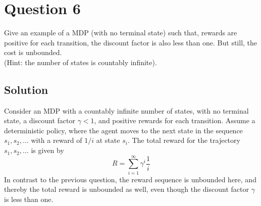 \section*{Question 6}

Give an example of a MDP (with no terminal state) such that, rewards are positive for each transition, the discount factor is also less than one.
But still, the cost is unbounded. \\
(Hint: the number of states is countably infinite).

\subsection*{Solution}

Consider an MDP with a countably infinite number of states, with no terminal state, a discount factor \( \gamma < 1 \), and positive rewards for each transition.
Assume a deterministic policy, where the agent moves to the next state in the sequence \( s_1, s_2, \dots \) with a reward of \( 1/i \) at state \( s_i \).
The total reward for the trajectory \( s_1, s_2, \dots \) is given by
\[
    R = \sum_{i=1}^{\infty} \gamma^i \frac{1}{i}
\]
In contrast to the previous question, the reward sequence is unbounded here, and thereby the total reward is unbounded as well, even though the discount factor \( \gamma \) is less than one.
